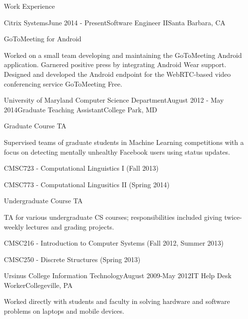 \documentclass{resume} %
\begin{document}
\begin{rSection}{Work Experience}
\begin{rSubsection}{Citrix Systems}{June 2014 - Present}{Software Engineer II}{Santa Barbara, CA}
\item
\begin{rWorkProject}{GoToMeeting for Android}
\item Worked on a small team developing and maintaining the GoToMeeting Android application. Garnered positive press by integrating Android Wear support. Designed and developed the Android endpoint for the WebRTC-based video conferencing service GoToMeeting Free.
\end{rWorkProject}
\end{rSubsection}
\begin{rSubsection}{University of Maryland Computer Science Department}{August 2012 - May 2014}{Graduate Teaching Assistant}{College Park, MD}
\item
\begin{rWorkProject}{Graduate Course TA}
\item Supervised teams of graduate students in Machine Learning competitions with a focus on detecting mentally unhealthy Facebook users using status updates.
\item CMSC723 - Computational Linguistics I (Fall 2013)
\item CMSC773 - Computational Lingusitics II (Spring 2014)
\end{rWorkProject}
\item
\begin{rWorkProject}{Undergraduate Course TA}
\item TA for various undergraduate CS courses; responsibilities included giving twice-weekly lectures and grading projects.
\item CMSC216 - Introduction to Computer Systems (Fall 2012, Summer 2013)
\item CMSC250 - Discrete Structures (Spring 2013)
\end{rWorkProject}
\end{rSubsection}

\begin{rSubsection}{Ursinus College Information Technology}{August 2009-May 2012}{IT Help Desk Worker}{Collegeville, PA}
\item Worked directly with students and faculty in solving hardware and software problems on laptops and mobile devices. 
\end{rSubsection}
\end{rSection}
\end{document}
